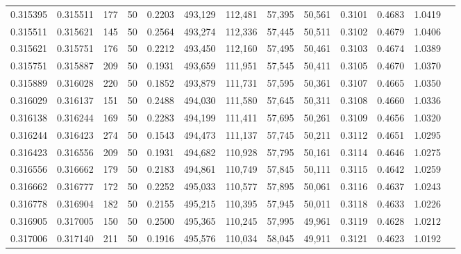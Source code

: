\begin{tabular}{rrrrrrrrrrrrr}
0.315395 & 0.315511 &   177 &  50 &                                     0.2203 & 493,129 & 112,481 &  57,395 &  50,561 & 0.3101 & 0.4683 & 1.0419 \\
0.315511 & 0.315621 &   145 &  50 &                                     0.2564 & 493,274 & 112,336 &  57,445 &  50,511 & 0.3102 & 0.4679 & 1.0406 \\
0.315621 & 0.315751 &   176 &  50 &                                     0.2212 & 493,450 & 112,160 &  57,495 &  50,461 & 0.3103 & 0.4674 & 1.0389 \\
0.315751 & 0.315887 &   209 &  50 &                                     0.1931 & 493,659 & 111,951 &  57,545 &  50,411 & 0.3105 & 0.4670 & 1.0370 \\
0.315889 & 0.316028 &   220 &  50 &                                     0.1852 & 493,879 & 111,731 &  57,595 &  50,361 & 0.3107 & 0.4665 & 1.0350 \\
0.316029 & 0.316137 &   151 &  50 &                                     0.2488 & 494,030 & 111,580 &  57,645 &  50,311 & 0.3108 & 0.4660 & 1.0336 \\
0.316138 & 0.316244 &   169 &  50 &                                     0.2283 & 494,199 & 111,411 &  57,695 &  50,261 & 0.3109 & 0.4656 & 1.0320 \\
0.316244 & 0.316423 &   274 &  50 &                                     0.1543 & 494,473 & 111,137 &  57,745 &  50,211 & 0.3112 & 0.4651 & 1.0295 \\
0.316423 & 0.316556 &   209 &  50 &                                     0.1931 & 494,682 & 110,928 &  57,795 &  50,161 & 0.3114 & 0.4646 & 1.0275 \\
0.316556 & 0.316662 &   179 &  50 &                                     0.2183 & 494,861 & 110,749 &  57,845 &  50,111 & 0.3115 & 0.4642 & 1.0259 \\
0.316662 & 0.316777 &   172 &  50 &                                     0.2252 & 495,033 & 110,577 &  57,895 &  50,061 & 0.3116 & 0.4637 & 1.0243 \\
0.316778 & 0.316904 &   182 &  50 &                                     0.2155 & 495,215 & 110,395 &  57,945 &  50,011 & 0.3118 & 0.4633 & 1.0226 \\
0.316905 & 0.317005 &   150 &  50 &                                     0.2500 & 495,365 & 110,245 &  57,995 &  49,961 & 0.3119 & 0.4628 & 1.0212 \\
0.317006 & 0.317140 &   211 &  50 &                                     0.1916 & 495,576 & 110,034 &  58,045 &  49,911 & 0.3121 & 0.4623 & 1.0192 \\

\end{tabular}
